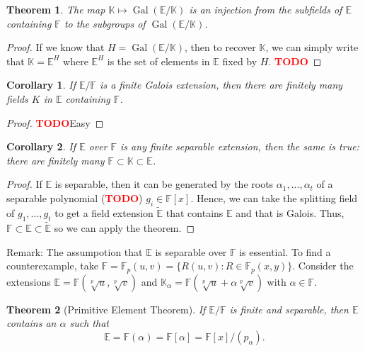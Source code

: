 \documentclass{article}
\newtheorem*{theorem}{Theorem}
\newtheorem*{corollary}{Corollary}
\newcommand{\F}{\mathbb{F}}
\newcommand{\E}{\mathbb{E}}
\newcommand{\K}{\mathbb{K}}
\DeclareMathOperator{\Gal}{\text{Gal}}
\newcommand{\td}{\textcolor{red}{\textbf{TODO}}}
\begin{document}
\begin{theorem}
    The map $\K \mapsto \Gal(\E / \K)$ is an injection from the subfields of $\E$ containing $\F$ to the subgroups of $\Gal(\E / \K)$.
\end{theorem}

\begin{proof}
    If we know that $H = \Gal(\E / \K)$, then to recover $\K$, we can simply write that $\K = \E^H$ where $\E^H$ is the set of elements in $\E$ fixed by $H$. \td
\end{proof}

\begin{corollary}
    If $\E / \F$ is a finite Galois extension, then there are finitely many fields $K$ in $\E$ containing $\F$.
\end{corollary}

\begin{proof}
    \td Easy
\end{proof}

\begin{corollary}
    If $\E$ over $\F$ is any finite separable extension, then the same is true: there are finitely many $\F \subset \K \subset \E$.
\end{corollary}

\begin{proof}
    If $\E$ is separable, then it can be generated by the roots $\alpha_1, ..., \alpha_t$ of a separable polynomial (\td) $g_i \in \F[x]$. Hence, we can take the splitting field of $g_1, ..., g_t$ to get a field extension $\tilde{\E}$ that contains $\E$ and that is Galois. Thus, $\F \subset \E \subset \tilde{\E}$ so we can apply the theorem.
\end{proof}

Remark: The assumpotion that $\E$ is separable over $\F$ is essential. To find a counterexample, take $\F = \F_p(u,v) = \{R(u,v) : R \in \F_p(x,y)\}$. Consider the extensions $\E = \F(\sqrt[p]{u}, \sqrt[p]{v})$ and $\K_{\alpha} = \F(\sqrt[p]{u} + \alpha \sqrt[p]{v})$ with $\alpha \in \F$.

\begin{theorem}[Primitive Element Theorem]
    If $\E / \F$ is finite and separable, then $\E$ contains an $\alpha$ such that
    $$\E = \F(\alpha) = \F[\alpha] = \F[x]/(p_{\alpha}).$$
\end{theorem}
\end{document}
